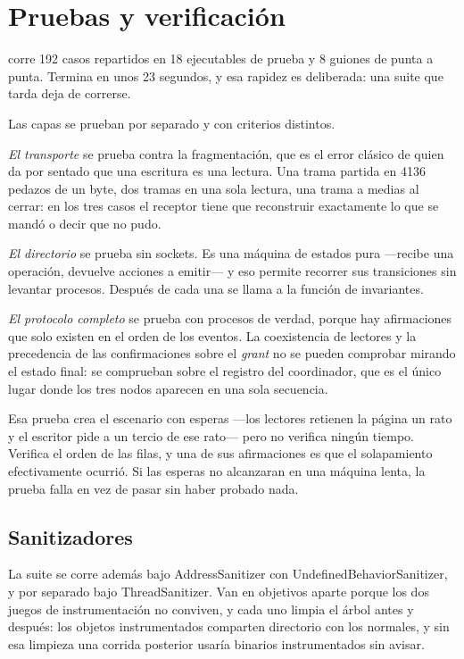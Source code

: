 \section{Pruebas y verificación}
\label{sec:pruebas}

 corre 192 casos repartidos en 18 ejecutables de prueba y 8
guiones de punta a punta. Termina en unos 23 segundos, y esa rapidez es
deliberada: una suite que tarda deja de correrse.

Las capas se prueban por separado y con criterios distintos.

\emph{El transporte} se prueba contra la fragmentación, que es el error
clásico de quien da por sentado que una escritura es una lectura. Una trama
partida en 4136 pedazos de un byte, dos tramas en una sola lectura, una trama
a medias al cerrar: en los tres casos el receptor tiene que reconstruir
exactamente lo que se mandó o decir que no pudo.

\emph{El directorio} se prueba sin sockets. Es una máquina de estados pura
—recibe una operación, devuelve acciones a emitir— y eso permite recorrer sus
transiciones sin levantar procesos. Después de cada una se llama a la función
de invariantes.

\emph{El protocolo completo} se prueba con procesos de verdad, porque hay
afirmaciones que solo existen en el orden de los eventos. La coexistencia de
lectores y la precedencia de las confirmaciones sobre el \emph{grant} no se
pueden comprobar mirando el estado final: se comprueban sobre el registro del
coordinador, que es el único lugar donde los tres nodos aparecen en una sola
secuencia.

Esa prueba crea el escenario con esperas —los lectores retienen la página un
rato y el escritor pide a un tercio de ese rato— pero no verifica ningún
tiempo. Verifica el orden de las filas, y una de sus afirmaciones es que el
solapamiento efectivamente ocurrió. Si las esperas no alcanzaran en una
máquina lenta, la prueba falla en vez de pasar sin haber probado nada.

\subsection{Sanitizadores}

La suite se corre además bajo AddressSanitizer con UndefinedBehaviorSanitizer,
y por separado bajo ThreadSanitizer. Van en objetivos aparte porque los dos
juegos de instrumentación no conviven, y cada uno limpia el árbol antes y
después: los objetos instrumentados comparten directorio con los normales, y
sin esa limpieza una corrida posterior usaría binarios instrumentados sin
avisar.

